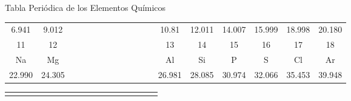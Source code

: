 \begin{infocard}{Tabla Periódica de los Elementos Químicos}
\begin{center}
\begin{tabular}{|c|c|p{17.8mm}*{9}{p{8.98mm}}|c|c|c|c|c|c|}
            \small 6.941                               & \small 9.012\hspace{0.5mm}                  &  &  &  &  &  &  &  &  &  &  & \small 10.81                               & \small 12.011                               & \small 14.007                             & \small 15.999 & \small 18.998                             & \small 20.180 \\[-1mm]\cline{1-2}\cline{13-18}
            \small 11                                  & \small 12                                   &  &  &  &  &  &  &  &  &  &  & \small 13                                  & \small 14                                   & \small 15                                 & \small 16     & \small 17                                 & \small 18     \\[-1mm]
            Na                                         & Mg                                          &  &  &  &  &  &  &  &  &  &  & Al                                         & Si                                          & P                                         & S             & Cl                                        & Ar            \\[-2mm]
            \small \hspace{0.75mm}22.990\hspace{0.8mm} & \small \hspace{0.83mm}24.305\hspace{0.83mm} &  &  &  &  &  &  &  &  &  &  & \small \hspace{0.8mm}26.981\hspace{0.78mm} & \small \hspace{0.95mm}28.085\hspace{0.73mm} & \small \hspace{0.8mm}30.974\hspace{0.8mm} & \small 32.066 & \small \hspace{0.8mm}35.453\hspace{0.8mm} & \small 39.948 \\
            \hline
        \end{tabular}
        \vspace{-3mm}
        \begin{tabular}{|c*{16}{|c}|c|}
                           &                &                &               &                &               &                &               &                &               &                &               &                &                &                &               &                &                                   \\[-6.8mm]

\end{tabular}
\end{center}
\end{infocard}
